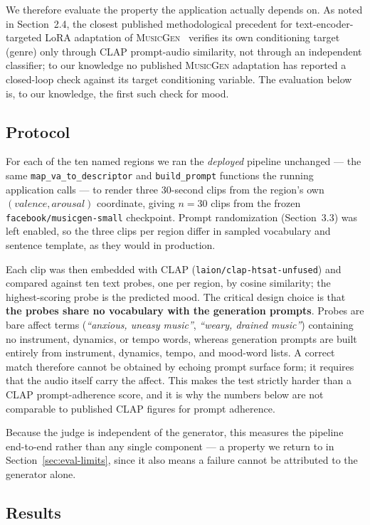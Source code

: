 \documentclass[11pt]{article}
\newcommand{\musicgen}{\textsc{MusicGen}}
\begin{document}
We therefore evaluate the property the application actually depends on. As noted in Section~2.4, the closest published methodological precedent for text-encoder-targeted LoRA adaptation of \musicgen{}~\cite{lee2026loramusicgen} verifies its own conditioning target (genre) only through CLAP prompt-audio similarity, not through an independent classifier; to our knowledge no published \musicgen{} adaptation has reported a closed-loop check against its target conditioning variable. The evaluation below is, to our knowledge, the first such check for mood.

\subsection{Protocol}

For each of the ten named regions we ran the \emph{deployed} pipeline unchanged --- the same \texttt{map\_va\_to\_descriptor} and \texttt{build\_prompt} functions the running application calls --- to render three 30-second clips from the region's own $(valence, arousal)$ coordinate, giving $n = 30$ clips from the frozen \texttt{facebook/musicgen-small} checkpoint. Prompt randomization (Section~3.3) was left enabled, so the three clips per region differ in sampled vocabulary and sentence template, as they would in production.

Each clip was then embedded with CLAP (\texttt{laion/clap-htsat-unfused}) and compared against ten text probes, one per region, by cosine similarity; the highest-scoring probe is the predicted mood. The critical design choice is that \textbf{the probes share no vocabulary with the generation prompts}. Probes are bare affect terms (\emph{``anxious, uneasy music''}, \emph{``weary, drained music''}) containing no instrument, dynamics, or tempo words, whereas generation prompts are built entirely from instrument, dynamics, tempo, and mood-word lists. A correct match therefore cannot be obtained by echoing prompt surface form; it requires that the audio itself carry the affect. This makes the test strictly harder than a CLAP prompt-adherence score, and it is why the numbers below are not comparable to published CLAP figures for prompt adherence.

Because the judge is independent of the generator, this measures the pipeline end-to-end rather than any single component --- a property we return to in Section~\ref{sec:eval-limits}, since it also means a failure cannot be attributed to the generator alone.

\subsection{Results}
\end{document}
